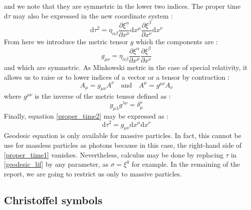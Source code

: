 %
and we note that they are symmetric in the lower two indices.
The proper time $\mathrm{d}\tau$ may also be expressed in the new coordinate system :
%
\begin{equation}\label{proper_time2}
	\mathrm{d}\tau^2 = \eta_{\alpha\beta} \frac{\partial \xi^\alpha}{\partial x^\mu}
	\mathrm{d}x^\mu \frac{\partial \xi^\beta}{\partial x^\nu} \mathrm{d}x^\nu
\end{equation}
%
From here we introduce the metric tensor $g$ which the components are :
%
\begin{equation}\label{metric1}
	g_{\mu\nu} = \eta_{\alpha\beta} \frac{\partial \xi^\alpha}{\partial x^\mu}
	\frac{\partial \xi^\beta}{\partial x^\nu}
\end{equation}
%
and which are symmetric. As Minkowski metric in the case of special relativity,
it allows us to raise or to lower indices of a vector or a tensor by contraction :
%
\begin{equation}
 A_\mu = g_{\mu\nu} A^\nu \quad \mathrm{and} \quad A^\mu = g^{\mu\nu} A_\nu
\end{equation}
%
where $g^{\mu\nu}$ is the inverse of the metric tensor defined as :
%
\begin{equation}
	g_{\mu\lambda}g^{\lambda\nu} = \delta^\nu_\mu
\end{equation}
%
Finally, equation \eqref{proper_time2} may be expressed as :
%
\begin{equation}\label{invariant}
	\mathrm{d}\tau^2 = g_{\mu\nu}\mathrm{d}x^\mu\mathrm{d}x^\nu
\end{equation}
%
Geodesic equation is only available for massive particles. In fact, this cannot be use for
massless particles as photons because in this case, the right-hand side of
\eqref{proper_time1} vanishes. Nevertheless, calculus may be done by replacing $\tau$ in
\eqref{geodesic_lif} by any parameter, as $\sigma = \xi^0$ for example. In the remaining of the report,
we are going to restrict us only to massive particles.

\subsection{Christoffel symbols}

